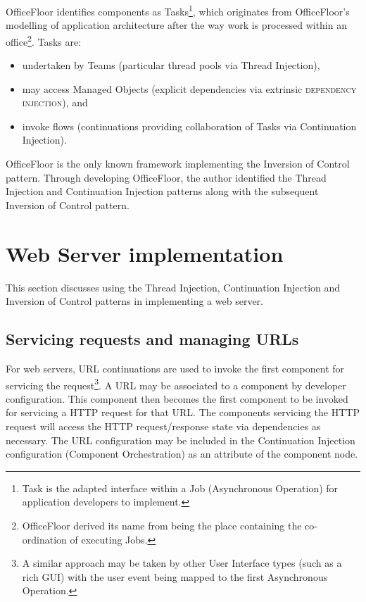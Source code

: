 \documentclass[prodmode]{style/acmlarge}
\begin{document}
OfficeFloor \cite{officefloor} identifies components as Tasks\footnote{Task is
the adapted interface within a Job (Asynchronous Operation) for application
developers to implement.}, which originates from OfficeFloor's modelling of
application architecture after the way work is processed within an
office\footnote{OfficeFloor derived its name from being the place containing the
co-ordination of executing Jobs.}.  Tasks are:
\begin{itemize}
  \item undertaken by Teams (particular thread pools via Thread Injection),
  \item may access Managed Objects (explicit dependencies via extrinsic \textsc{dependency injection}), and
  \item invoke flows (continuations providing collaboration of Tasks via Continuation Injection).
\end{itemize}

OfficeFloor is the only known framework implementing the Inversion of Control
pattern.  Through developing OfficeFloor, the author identified the Thread
Injection and Continuation Injection patterns along with the subsequent
Inversion of Control pattern.



\section{Web Server implementation}

This section discusses using the Thread Injection, Continuation Injection and
Inversion of Control patterns in implementing a web server.


\subsection{Servicing requests and managing URLs}

For web servers, URL continuations \cite{url-continuation} are used to invoke
the first component for servicing the request\footnote{A similar approach may be
taken by other User Interface types (such as a rich GUI) with the user event
being mapped to the first Asynchronous Operation.}.  A URL may be associated to
a component by developer configuration.  This component then becomes the first
component to be invoked for servicing a HTTP request for that URL.  The
components servicing the HTTP request will access the HTTP request/response
state via dependencies as necessary.  The URL configuration may be included in the
Continuation Injection configuration (Component Orchestration) as an attribute
of the component node.
\end{document}

